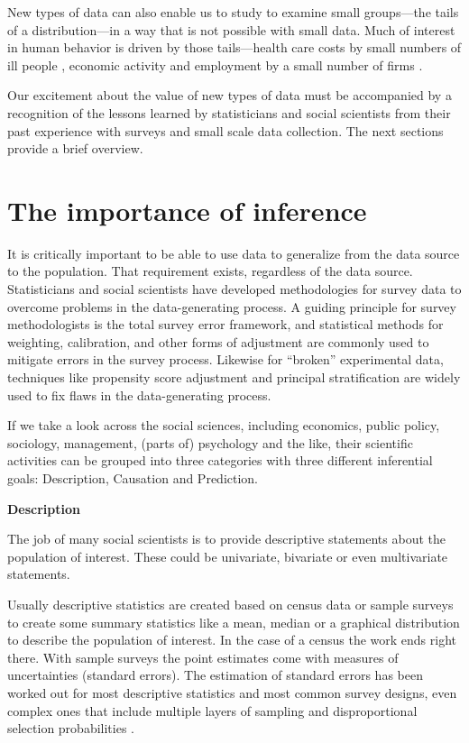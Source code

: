 \documentclass[]{krantz}
\begin{document}
New types of data can also enable us to study to examine small
groups---the tails of a distribution---in a way that is not possible
with small data. Much of interest in human behavior is driven by those
tails---health care costs by small numbers of ill people
\citep{stanton2006high}, economic activity and employment by a small
number of firms \citep[\citet{jovanovic1982selection}]{evans1987tests}.

Our excitement about the value of new types of data must be accompanied
by a recognition of the lessons learned by statisticians and social
scientists from their past experience with surveys and small scale data
collection. The next sections provide a brief overview.

\section{The importance of inference}\label{sec:1.3}

It is critically important to be able to use data to generalize from the
data source to the population. That requirement exists, regardless of
the data source. Statisticians and social scientists have developed
methodologies for survey data to overcome problems in the
data-generating process. A guiding principle for survey methodologists
is the total survey error framework, and statistical methods for
weighting, calibration, and other forms of adjustment are commonly used
to mitigate errors in the survey process. Likewise for ``broken''
experimental data, techniques like propensity score adjustment and
principal stratification are widely used to fix flaws in the
data-generating process.

If we take a look across the social sciences, including economics,
public policy, sociology, management, (parts of) psychology and the
like, their scientific activities can be grouped into three categories
with three different inferential goals: Description, Causation and
Prediction.

\textbf{Description}

The job of many social scientists is to provide descriptive statements
about the population of interest. These could be univariate, bivariate
or even multivariate statements.

Usually descriptive statistics are created based on census data or
sample surveys to create some summary statistics like a mean, median or
a graphical distribution to describe the population of interest. In the
case of a census the work ends right there. With sample surveys the
point estimates come with measures of uncertainties (standard errors).
The estimation of standard errors has been worked out for most
descriptive statistics and most common survey designs, even complex ones
that include multiple layers of sampling and disproportional selection
probabilities \citep[\citet{valliant2018practical}]{hansen1993sample}.
\end{document}
